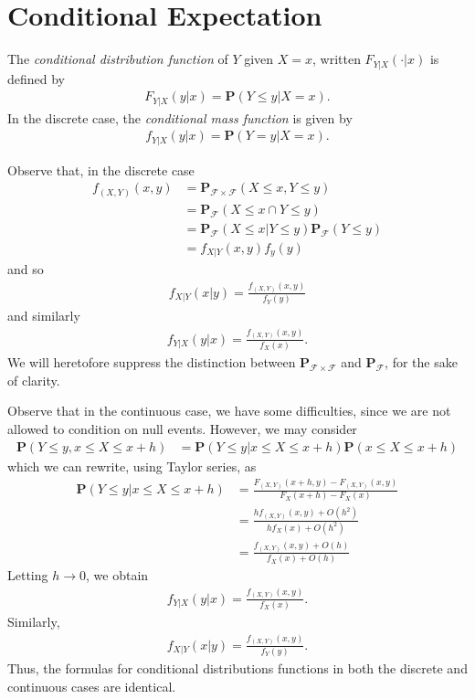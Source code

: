\section{Conditional Expectation}
\begin{definition}
	The \emph{conditional distribution function} of $Y$ given $X = x$,
	written $F_{Y|X}(\cdot | x)$ is defined by
	\begin{align*}
		F_{Y|X}(y|x) = \mathbf{P} (Y \le y | X = x).
	\end{align*}
	In the discrete case, the \emph{conditional mass function}
	is given by
	\begin{align*}
		f_{Y|X}(y|x) = \mathbf{P}(Y = y | X = x).
	\end{align*}
\end{definition}
Observe that, in the discrete case
\begin{align*}
	f_{(X,Y)}(x,y)
	& = \mathbf{P}_{\mathcal{F} \times \mathcal{F}}(X \le x, Y \le y)
	\\
	& = \mathbf{P}_{\mathcal{F}} (X \le x \cap Y \le y)
	\\
	& = \mathbf{P}_{\mathcal{F}}(X \le x | Y \le y) \mathbf{P}_{\mathcal{F}}(Y \le y)
	\\
	& = f_{X|Y}	(x,y) f_y(y)	
\end{align*}
and so
\begin{align*}
	f_{X|Y}(x|y) = \frac{f_{(X,Y)}(x,y)}{f_Y(y)}
\end{align*}
and similarly
\begin{align*}
	f_{Y|X}(y|x) = \frac{f_{(X,Y)}(x,y)}{f_X(x)}.
\end{align*}
We will heretofore suppress the distinction between $\mathbf{P}_{\mathcal{F} \times
\mathcal{F}}$ and $\mathbf{P}_{\mathcal{F}}$, for the sake of clarity.

Observe that in
the continuous case, we have some difficulties,
since we are not allowed to condition on null events. However, we may consider
\begin{align*}
	\mathbf{P}(Y \le y , x \le X \le x + h)
	& = \mathbf{P}(Y \le y | x \le X \le x +h) \mathbf{P}(x \le X \le x + h)
\end{align*}
which we can rewrite, using Taylor series, as
\begin{align*}
	\mathbf{P}(Y \le y | x \le X \le x + h)
	& = \frac{F_{(X,Y)}(x+h,y ) - F_{(X,Y)}(x,y )}{F_X(x+h) - F_X(x)}
	\\
	& = \frac{hf_{(X,Y)}(x,y) + O(h^2)}{hf_X(x) + O(h^2)}
	\\
	& = \frac{f_{(X,Y)}(x,y) + O(h)}{f_X(x) + O(h)}
\end{align*}
Letting $h \to 0$, we obtain
\begin{align*}
	f_{Y|X}(y|x) = \frac{f_{(X,Y)}(x,y)}{f_X(x)}.
\end{align*}
Similarly, 
\begin{align*}
	f_{X|Y}(x|y) = \frac{f_{(X,Y)}(x,y)}{f_Y(y)}.
\end{align*}
Thus, the formulas for conditional distributions
functions in both the discrete and continuous cases are identical.


